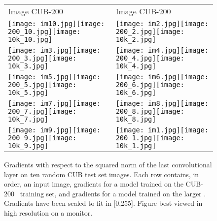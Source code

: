 \documentclass[runningheads]{llncs}
\begin{document}
\begin{figure}[t]
\centering
\begin{tabular}{ll}
\hspace{4mm} Image \hspace{5.5mm} CUB-200 \hspace{5mm} \lbird{} &
  \hspace{4mm} Image \hspace{5.5mm} CUB-200 \hspace{5mm} \lbird{}\\
  \texttt{[image: im10.jpg]}\texttt{[image: 200\_10.jpg]}\texttt{[image: 10k\_10.jpg]} &
  \texttt{[image: im2.jpg]}\texttt{[image: 200\_2.jpg]}\texttt{[image: 10k\_2.jpg]} \\
  \texttt{[image: im3.jpg]}\texttt{[image: 200\_3.jpg]}\texttt{[image: 10k\_3.jpg]} &
  \texttt{[image: im4.jpg]}\texttt{[image: 200\_4.jpg]}\texttt{[image: 10k\_4.jpg]} \\
  \texttt{[image: im5.jpg]}\texttt{[image: 200\_5.jpg]}\texttt{[image: 10k\_5.jpg]} &
  \texttt{[image: im6.jpg]}\texttt{[image: 200\_6.jpg]}\texttt{[image: 10k\_6.jpg]} \\
  \texttt{[image: im7.jpg]}\texttt{[image: 200\_7.jpg]}\texttt{[image: 10k\_7.jpg]} &
  \texttt{[image: im8.jpg]}\texttt{[image: 200\_8.jpg]}\texttt{[image: 10k\_8.jpg]} \\
  \texttt{[image: im9.jpg]}\texttt{[image: 200\_9.jpg]}\texttt{[image: 10k\_9.jpg]} &
  \texttt{[image: im1.jpg]}\texttt{[image: 200\_1.jpg]}\texttt{[image: 10k\_1.jpg]} \\
\end{tabular}
\caption{
Gradients with respect to the squared norm of the last convolutional layer on ten random CUB test set images.
Each row contains, in order, an input image, gradients for a model trained on the CUB-200~\cite{wah2011multiclass} training set, and gradients for a model trained on the larger \lbird{}.
Gradients have been scaled to fit in [0,255].
Figure best viewed in high resolution on a monitor.}
\label{fig:dream}
\end{figure}


\clearpage


\end{document}
